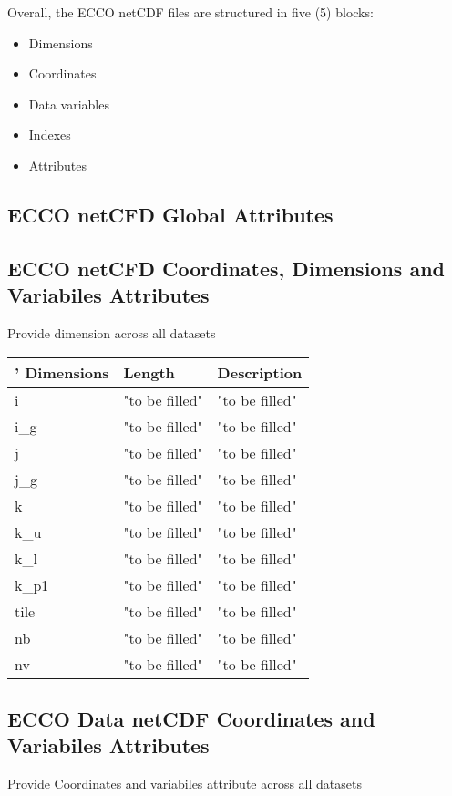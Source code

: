 \par \vspace{0.1in} Overall, the ECCO netCDF  files are structured in five (5) blocks: 
\begin{itemize}
    \item Dimensions
    \item Coordinates
    \item Data variables
    \item Indexes
    \item Attributes
\end{itemize}

\subsection{ECCO netCFD Global Attributes}

\subsection{ECCO netCFD Coordinates, Dimensions and Variabiles Attributes}
\par Provide dimension across all datasets

\begin{longtable}{|m{}|m{}|m{}|}
    \hline \endhead \hline \endfoot'
    Dimensions & Length & Description \\ \hline
    i & "to be filled" & "to be filled" \\ \hline
    i\_g & "to be filled" & "to be filled" \\ \hline
    j & "to be filled" & "to be filled" \\ \hline
    j\_g & "to be filled" & "to be filled" \\ \hline
    k & "to be filled" & "to be filled" \\ \hline
    k\_u & "to be filled" & "to be filled" \\ \hline
    k\_l & "to be filled" & "to be filled" \\ \hline
    k\_p1 & "to be filled" & "to be filled" \\ \hline
    tile & "to be filled" & "to be filled" \\ \hline
    nb & "to be filled" & "to be filled" \\ \hline
    nv & "to be filled" & "to be filled" \\ \hline    
\end{longtable}
\subsection{ECCO Data netCDF Coordinates and Variabiles Attributes}
\par Provide Coordinates and variabiles attribute across all datasets
    

